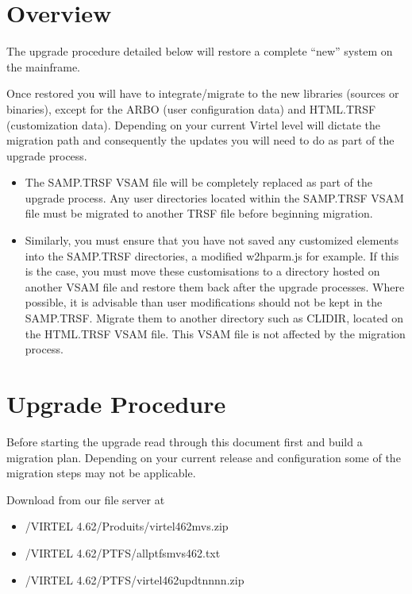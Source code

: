 \documentclass[letterpaper,10pt,english]{sphinxmanual}
\begin{document}
\section{Overview}
\label{\detokenize{Migration_Guide:overview}}
\sphinxAtStartPar
The upgrade procedure detailed below will restore a complete “new” system on the mainframe.

\sphinxAtStartPar
Once restored you will have to integrate/migrate to the new libraries (sources or binaries), except for the ARBO (user configuration data) and HTML.TRSF (customization data). Depending on your current Virtel level will dictate the migration path and consequently the updates you will need to do as part of the upgrade process.
\begin{itemize}
\item {} 
\sphinxAtStartPar
The SAMP.TRSF VSAM file will be completely replaced as part of the upgrade process. Any user directories located within the SAMP.TRSF VSAM file must be migrated to another TRSF file before beginning migration.

\item {} 
\sphinxAtStartPar
Similarly, you must ensure that you have not saved any customized elements into the SAMP.TRSF directories, a modified w2hparm.js for example. If this is the case, you must move these customisations to a directory hosted on another VSAM file and restore them back after the upgrade processes. Where possible, it is advisable than user modifications should not be kept in the SAMP.TRSF. Migrate them to another directory such as CLI\sphinxhyphen{}DIR, located on the HTML.TRSF VSAM file. This VSAM file is not affected by the migration process.

\end{itemize}

\newpage

\ignorespaces 

\section{Upgrade Procedure}
\label{\detokenize{Migration_Guide:upgrade-procedure}}\label{\detokenize{Migration_Guide:index-1}}
\sphinxAtStartPar
Before starting the upgrade read through this document first and build a migration plan. Depending on your current release and configuration some of the migration steps may not be applicable.

\sphinxAtStartPar
Download from our file server at 
\begin{itemize}
\item {} 
\sphinxAtStartPar
/VIRTEL 4.62/Produits/virtel462mvs.zip

\item {} 
\sphinxAtStartPar
/VIRTEL 4.62/PTFS/allptfs\sphinxhyphen{}mvs462.txt

\item {} 
\sphinxAtStartPar
/VIRTEL 4.62/PTFS/virtel462updtnnnn.zip

\end{itemize}
\end{document}
